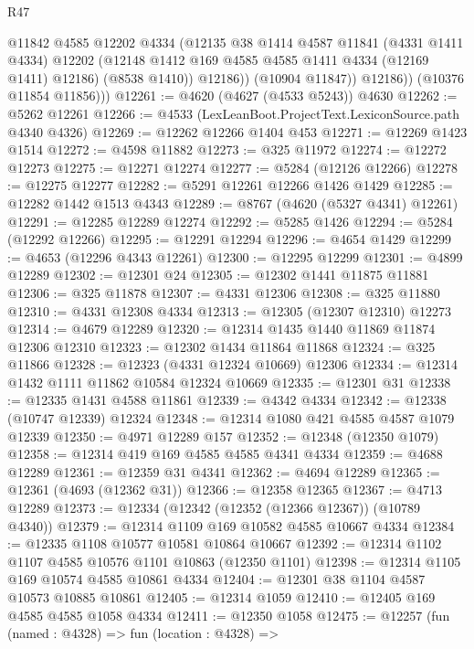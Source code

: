 \begin{lexlean}{R47}
\begin{coremodule}
                  @11842
                  @4585
                  @12202
                  @4334
                  (@12135
                    @38
                    @1414
                    @4587
                    @11841
                    (@4331 @1411 @4334)
                    @12202
                    (@12148 @1412 @169 @4585 @4585 @1411 @4334 (@12169 @1411) @12186)
                    (@8538 @1410))
                  @12186))
              (@10904 @11847))
            @12186))
        (@10376 @11854 @11856)))
@12261 := @4620 (@4627 (@4533 @5243)) @4630
@12262 := @5262 @12261
@12266 := @4533 (LexLeanBoot.ProjectText.LexiconSource.path @4340 @4326)
@12269 := @12262 @12266 @1404 @453
@12271 := @12269 @1423 @1514
@12272 := @4598 @11882
@12273 := @325 @11972
@12274 := @12272 @12273
@12275 := @12271 @12274
@12277 := @5284 (@12126 @12266)
@12278 := @12275 @12277
@12282 := @5291 @12261 @12266 @1426 @1429
@12285 := @12282 @1442 @1513 @4343
@12289 := @8767 (@4620 (@5327 @4341) @12261)
@12291 := @12285 @12289 @12274
@12292 := @5285 @1426
@12294 := @5284 (@12292 @12266)
@12295 := @12291 @12294
@12296 := @4654 @1429
@12299 := @4653 (@12296 @4343 @12261)
@12300 := @12295 @12299
@12301 := @4899 @12289
@12302 := @12301 @24
@12305 := @12302 @1441 @11875 @11881
@12306 := @325 @11878
@12307 := @4331 @12306
@12308 := @325 @11880
@12310 := @4331 @12308 @4334
@12313 := @12305 (@12307 @12310) @12273
@12314 := @4679 @12289
@12320 := @12314 @1435 @1440 @11869 @11874 @12306 @12310
@12323 := @12302 @1434 @11864 @11868
@12324 := @325 @11866
@12328 := @12323 (@4331 @12324 @10669) @12306
@12334 := @12314 @1432 @1111 @11862 @10584 @12324 @10669
@12335 := @12301 @31
@12338 := @12335 @1431 @4588 @11861
@12339 := @4342 @4334
@12342 := @12338 (@10747 @12339) @12324
@12348 := @12314 @1080 @421 @4585 @4587 @1079 @12339
@12350 := @4971 @12289 @157
@12352 := @12348 (@12350 @1079)
@12358 := @12314 @419 @169 @4585 @4585 @4341 @4334
@12359 := @4688 @12289
@12361 := @12359 @31 @4341
@12362 := @4694 @12289
@12365 := @12361 (@4693 (@12362 @31))
@12366 := @12358 @12365
@12367 := @4713 @12289
@12373 := @12334 (@12342 (@12352 (@12366 @12367)) (@10789 @4340))
@12379 := @12314 @1109 @169 @10582 @4585 @10667 @4334
@12384 := @12335 @1108 @10577 @10581 @10864 @10667
@12392 := @12314 @1102 @1107 @4585 @10576 @1101 @10863 (@12350 @1101)
@12398 := @12314 @1105 @169 @10574 @4585 @10861 @4334
@12404 := @12301 @38 @1104 @4587 @10573 @10885 @10861
@12405 := @12314 @1059
@12410 := @12405 @169 @4585 @4585 @1058 @4334
@12411 := @12350 @1058
@12475 := @12257
    (fun (named : @4328) =>
    fun (location : @4328) =>

\end{coremodule}
\end{lexlean}
